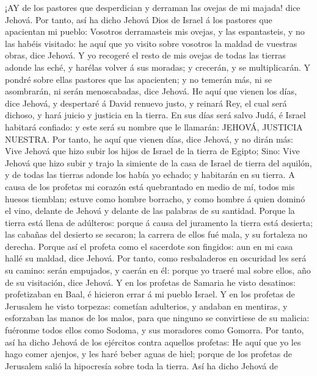  ¡AY de los pastores que desperdician y derraman las ovejas
de mi majada! dice Jehová.  Por tanto, así ha dicho Jehová
Dios de Israel á los pastores que apacientan mi pueblo: Vosotros
derramasteis mis ovejas, y las espantasteis, y no las habéis visitado:
he aquí que yo visito sobre vosotros la maldad de vuestras obras, dice
Jehová.  Y yo recogeré el resto de mis ovejas de todas las
tierras adonde las eché, y harélas volver á sus moradas; y crecerán, y
se multiplicarán.  Y pondré sobre ellas pastores que las
apacienten; y no temerán más, ni se asombrarán, ni serán menoscabadas,
dice Jehová.  He aquí que vienen los días, dice Jehová, y
despertaré á David renuevo justo, y reinará Rey, el cual será dichoso, y
hará juicio y justicia en la tierra.  En sus días será salvo
Judá, é Israel habitará confiado: y este será su nombre que le llamarán:
JEHOVÁ, JUSTICIA NUESTRA.  Por tanto, he aquí que vienen
días, dice Jehová, y no dirán más: Vive Jehová que hizo subir los hijos
de Israel de la tierra de Egipto;  Sino: Vive Jehová que
hizo subir y trajo la simiente de la casa de Israel de tierra del
aquilón, y de todas las tierras adonde los había yo echado; y habitarán
en su tierra.  A causa de los profetas mi corazón está
quebrantado en medio de mí, todos mis huesos tiemblan; estuve como
hombre borracho, y como hombre á quien dominó el vino, delante de Jehová
y delante de las palabras de su santidad.  Porque la tierra
está llena de adúlteros: porque á causa del juramento la tierra está
desierta; las cabañas del desierto se secaron; la carrera de ellos fué
mala, y su fortaleza no derecha.  Porque así el profeta
como el sacerdote son fingidos: aun en mi casa hallé su maldad, dice
Jehová.  Por tanto, como resbaladeros en oscuridad les será
su camino: serán empujados, y caerán en él: porque yo traeré mal sobre
ellos, año de su visitación, dice Jehová.  Y en los
profetas de Samaria he visto desatinos: profetizaban en Baal, é hicieron
errar á mi pueblo Israel.  Y en los profetas de Jerusalem
he visto torpezas: cometían adulterios, y andaban en mentiras, y
esforzaban las manos de los malos, para que ninguno se convirtiese de su
malicia: fuéronme todos ellos como Sodoma, y sus moradores como Gomorra.
 Por tanto, así ha dicho Jehová de los ejércitos contra
aquellos profetas: He aquí que yo les hago comer ajenjos, y les haré
beber aguas de hiel; porque de los profetas de Jerusalem salió la
hipocresía sobre toda la tierra.  Así ha dicho Jehová de

